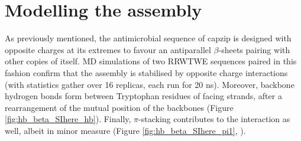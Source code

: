 \section{Modelling the assembly} \label{sec:build}

As previously mentioned, the antimicrobial sequence of capzip is designed with opposite charges at its extremes to favour an antiparallel $\beta$-sheets pairing with other copies of itself.
%
MD simulations of two RRWTWE sequences paired in this fashion confirm that the assembly is stabilised by opposite charge interactions (with statistics gather over 16 replicas, each run for 20 ns).
%
Moreover, backbone hydrogen bonds form between Tryptophan residues of facing strands, after a rearrangement of the mutual position of the backbones (Figure \ref{fig:hb_beta_SIhere_hb}).
%
Finally, $\pi$-stacking contributes to the interaction as well, albeit in minor measure (Figure \ref{fig:hb_beta_SIhere_pi1}, ).

